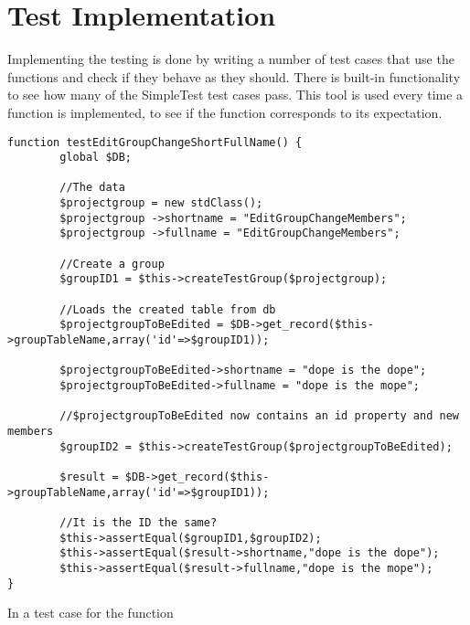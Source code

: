 \section{Test Implementation}
\label{sec:testimplementation}

Implementing the testing is done by writing a number of test cases that use the functions and check if they behave as they should.
There is built-in functionality to see how many of the SimpleTest test cases pass.
This tool is used every time a function is implemented, to see if the function corresponds to its expectation.

\begin{lstlisting}[style=phpCode, caption=\myCaption{A test case for the function createTestGroup. The test case tests if the function handles editing of the short and full name correctly.}, label=testcaseedit]
function testEditGroupChangeShortFullName() {
		global $DB;
	  
		//The data
		$projectgroup = new stdClass();
		$projectgroup ->shortname = "EditGroupChangeMembers";
		$projectgroup ->fullname = "EditGroupChangeMembers";
		
		//Create a group
		$groupID1 = $this->createTestGroup($projectgroup);
		
		//Loads the created table from db
		$projectgroupToBeEdited = $DB->get_record($this->groupTableName,array('id'=>$groupID1));
		
		$projectgroupToBeEdited->shortname = "dope is the dope";
		$projectgroupToBeEdited->fullname = "dope is the mope";
    
		//$projectgroupToBeEdited now contains an id property and new members
		$groupID2 = $this->createTestGroup($projectgroupToBeEdited);
		
		$result = $DB->get_record($this->groupTableName,array('id'=>$groupID1));
    
		//It is the ID the same?
		$this->assertEqual($groupID1,$groupID2);
		$this->assertEqual($result->shortname,"dope is the dope");
		$this->assertEqual($result->fullname,"dope is the mope");
}
\end{lstlisting}

In  a test case for the function 